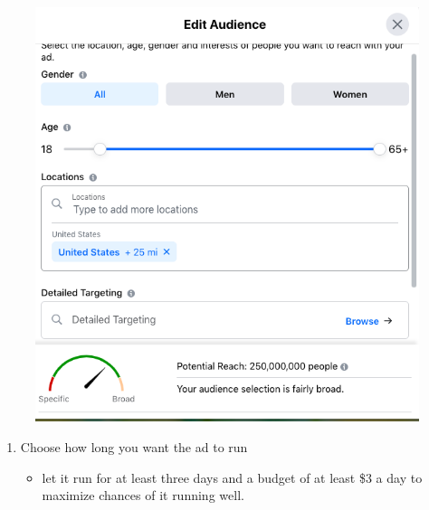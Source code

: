\documentclass[]{book}
\providecommand{\tightlist}{%
  \setlength{\itemsep}{0pt}\setlength{\parskip}{0pt}}
\begin{document}
\begin{figure}
\centering
\includegraphics{images/lab_protocols/fb_ads/8.png}
\caption{}
\end{figure}

\begin{enumerate}
\def\labelenumi{\arabic{enumi}.}
\setcounter{enumi}{8}
\item
  Choose how long you want the ad to run

  \begin{itemize}
  \tightlist
  \item
    let it run for at least three days and a budget of at least \$3 a day to maximize chances of it running well.
  \end{itemize}
\end{enumerate}
\end{document}

